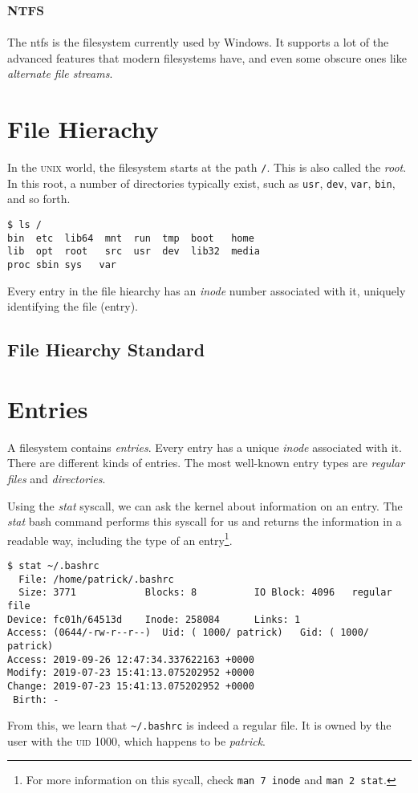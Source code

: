 \documentclass[a4paper]{article}
\begin{document}
\subsection{\textsc{ntfs}}

The \gls{ntfs} is the filesystem currently used by Windows. It supports a lot of the advanced features that modern filesystems have, and even some obscure ones like \emph{alternate file streams}.

\section{File Hierachy}

In the \textsc{unix} world, the filesystem starts at the path \verb|/|. This is also called the \emph{root}. In this root, a number of directories typically exist, such as \verb|usr|, \verb|dev|, \verb|var|, \verb|bin|, and so forth.

\begin{verbatim}
$ ls /
bin  etc  lib64  mnt  run  tmp  boot   home 
lib  opt  root   src  usr  dev  lib32  media 
proc sbin sys   var
\end{verbatim}

Every entry in the file hiearchy has an \emph{inode} number associated with it, uniquely identifying the file (entry).

\subsection{File Hiearchy Standard}

\section{Entries}

A filesystem contains \emph{entries}. Every entry has a unique \emph{inode} associated with it. There are different kinds of entries. The most well-known entry types are \emph{regular files} and \emph{directories}. 

Using the \emph{stat} syscall, we can ask the kernel about information on an entry. The \emph{stat} bash command performs this syscall for us and returns the information in a readable way, including the type of an entry\footnote{For more information on this sycall, check \texttt{man 7 inode} and \texttt{man 2 stat}.}.

\begin{verbatim}
$ stat ~/.bashrc
  File: /home/patrick/.bashrc
  Size: 3771            Blocks: 8          IO Block: 4096   regular file
Device: fc01h/64513d    Inode: 258084      Links: 1
Access: (0644/-rw-r--r--)  Uid: ( 1000/ patrick)   Gid: ( 1000/ patrick)
Access: 2019-09-26 12:47:34.337622163 +0000
Modify: 2019-07-23 15:41:13.075202952 +0000
Change: 2019-07-23 15:41:13.075202952 +0000
 Birth: -  
\end{verbatim}
From this, we learn that \verb|~/.bashrc| is indeed a regular file. It is owned by the user with the \textsc{uid} 1000, which happens to be \emph{patrick}. 
\end{document}

